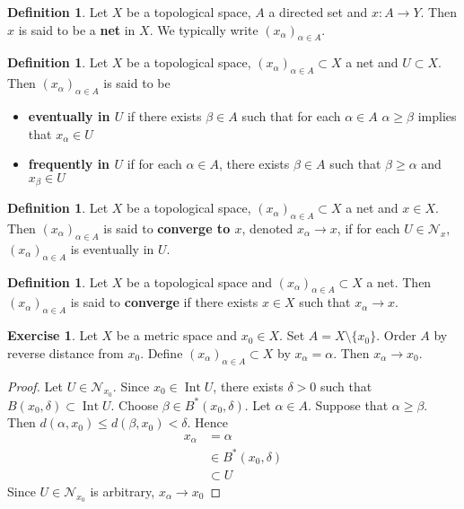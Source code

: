\documentclass[12pt]{amsart}
\theoremstyle{definition}
\newtheorem{defn}[definition]{Definition}
\newtheorem{ex}[definition]{Exercise}
\newcommand{\al}{\alpha}
\newcommand{\be}{\beta}
\newcommand{\del}{\delta}
\newcommand{\MN}{\mathcal{N}}
\DeclareMathOperator{\Int}{Int}
\newcommand{\ld}[1]{\label{defn:#1}}
\begin{document}
	\begin{defn} \ld{33004}
	Let $X$ be a topological space, $A$ a directed set and $x:A \rightarrow Y$. Then $x$ is said to be a \textbf{net} in $X$. We typically write $(x_{\al})_{\al \in A}$. 
	\end{defn}
	
	\begin{defn} \ld{33005}
	Let $X$ be a topological space, $(x_{\al})_{\al \in A} \subset X$ a net and $U \subset X$.
	Then $(x_{\al})_{\al \in A}$ is said to be 
	\begin{itemize}
	\item \textbf{eventually in $U$} if there exists $\be \in A$ such that for each $\al \in A$ $\al \geq \be$ implies that $x_{\al} \in U$
	\item \textbf{frequently in $U$}  if for each $\al \in A$, there exists $\be \in A$ such that $\be \geq \al $ and $x_{\be} \in U$
	\end{itemize}
	\end{defn}
	
	\begin{defn} \ld{33006}
	Let $X$ be a topological space, $(x_{\al})_{\al \in A} \subset X$ a net and $x \in X$. Then $(x_{\al})_{\al \in A}$ is said to \textbf{converge to $x$}, denoted $x_{\al} \rightarrow x$, if for each $U \in \MN_x$, $(x_{\al})_{\al \in A}$ is eventually in $U$. 
	\end{defn}	
	
	\begin{defn} \ld{33007}
	Let $X$ be a topological space and $(x_{\al})_{\al \in A} \subset X$ a net. Then $(x_{\al})_{\al \in A}$ is said to \textbf{converge} if there exists $x \in X$ such that $x_{\al} \rightarrow x$. 
	\end{defn}	

	\begin{ex}
		Let $X$ be a metric space and $x_0 \in X$. Set $A = X \setminus \{x_0\}$. Order $A$ by reverse distance from $x_0$. Define $(x_{\al})_{\al \in A} \subset X$ by $x_{\al} = \al$. Then $x_{\al} \rightarrow x_0$.
	\end{ex}

	\begin{proof}
		Let $U \in \MN_{x_0}$. Since $x_0 \in \Int U$, there exists $\del > 0$ such that $B(x_0, \del) \subset \Int U$. Choose $\be \in B^*(x_0, \del)$. Let $\al \in A$. Suppose that $\al \geq \be$. Then $d(\al, x_0) \leq d(\be, x_0) < \del$. Hence  
		\begin{align*}
			x_{\al} 
			&= \al  \\
			& \in B^*(x_0, \del) \\
			&\subset U
		\end{align*}
		Since $U \in \MN_{x_0}$ is arbitrary, $x_{\al} \rightarrow x_0 $
	\end{proof}
	
\end{document}
